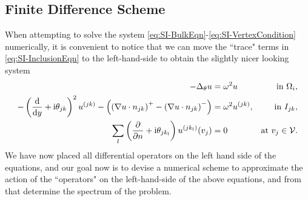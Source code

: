 
\subsection{Finite Difference Scheme} \label{ssec:FDMSingInc}
When attempting to solve the system \eqref{eq:SI-BulkEqn}-\eqref{eq:SI-VertexCondition} numerically, it is convenient to notice that we can move the ``trace" terms in \eqref{eq:SI-InclusionEqn} to the left-hand-side to obtain the slightly nicer looking system
\begin{align*}
	-\Delta_\theta u 
	&= \omega^2 u 
	&\text{in } \Omega_i, \\
	- \left( \dfrac{\mathrm{d}}{\mathrm{d}y} + \mathrm{i}\theta_{jk} \right)^2u^{(jk)}  - \left( \left( \nabla u\cdot n_{jk} \right)^+ - \left( \nabla u\cdot n_{jk} \right)^- \right)
	&= \omega^2 u^{(jk)},
	&\text{in } I_{jk}, \\
	\sum_l \left( \dfrac{\partial }{\partial n}+\mathrm{i}\theta_{jk_l} \right) u^{(jk_l)}(v_j) 
	&= 0 
	&\text{at } v_j\in\mathcal{V}.
\end{align*}
We have now placed all differential operators on the left hand side of the equations, and our goal now is to devise a numerical scheme to approximate the action of the ``operators" on the left-hand-side of the above equations, and from that determine the spectrum of the problem.


